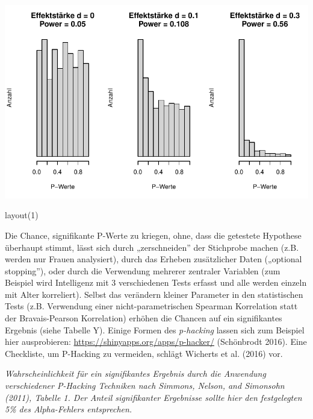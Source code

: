 \documentclass[
  letterpaper,
  DIV=11,
  numbers=noendperiod]{scrreprt}
\newenvironment{Shaded}{\begin{snugshade}}{\end{snugshade}}
\newcommand{\DecValTok}[1]{\textcolor[rgb]{0.68,0.00,0.00}{#1}}
\newcommand{\FunctionTok}[1]{\textcolor[rgb]{0.28,0.35,0.67}{#1}}
\newcommand{\NormalTok}[1]{\textcolor[rgb]{0.00,0.23,0.31}{#1}}
\begin{document}
\includegraphics{probleme_methoden_files/figure-pdf/unnamed-chunk-3-1.pdf}

\begin{Shaded}
\begin{Highlighting}[]
\FunctionTok{layout}\NormalTok{(}\DecValTok{1}\NormalTok{)}
\end{Highlighting}
\end{Shaded}

Die Chance, signifikante P-Werte zu kriegen, ohne, dass die getestete
Hypothese überhaupt stimmt, lässt sich durch „zerschneiden'' der
Stichprobe machen (z.B. werden nur Frauen analysiert), durch das Erheben
zusätzlicher Daten („optional stopping''), oder durch die Verwendung
mehrerer zentraler Variablen (zum Beispiel wird Intelligenz mit 3
verschiedenen Tests erfasst und alle werden einzeln mit Alter
korreliert). Selbst das verändern kleiner Parameter in den statistischen
Tests (z.B. Verwendung einer nicht-parametrischen Spearman Korrelation
statt der Bravais-Pearson Korrelation) erhöhen die Chancen auf ein
signifikantes Ergebnis (siehe Tabelle Y). Einige Formen des
\emph{p-hacking} lassen sich zum Beispiel hier ausprobieren:
\url{https://shinyapps.org/apps/p-hacker/} (Schönbrodt 2016). Eine
Checkliste, um P-Hacking zu vermeiden, schlägt Wicherts et al. (2016)
vor.

\emph{Wahrscheinlichkeit für ein signifikantes Ergebnis durch die
Anwendung verschiedener P-Hacking Techniken nach Simmons, Nelson, and
Simonsohn (2011), Tabelle 1. Der Anteil signifikanter Ergebnisse sollte
hier den festgelegten 5\% des Alpha-Fehlers entsprechen.}
\end{document}

